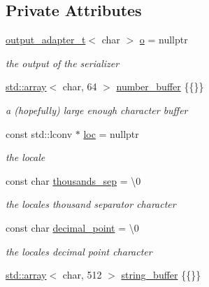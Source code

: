 \subsection*{Private Attributes}
\begin{DoxyCompactItemize}
\item 
\hyperlink{namespacenlohmann_1_1detail_a0fd8edff7729aa2dd92b070964bade2e}{output\+\_\+adapter\+\_\+t}$<$ char $>$ \hyperlink{classnlohmann_1_1detail_1_1serializer_acf3c88660d3cbc65fc71c4d84f2a9f59}{o} = nullptr
\begin{DoxyCompactList}\small\item\em the output of the serializer \end{DoxyCompactList}\item 
\hyperlink{namespacenlohmann_1_1detail_a1ed8fc6239da25abcaf681d30ace4985af1f713c9e000f5d3f280adbd124df4f5}{std\+::array}$<$ char, 64 $>$ \hyperlink{classnlohmann_1_1detail_1_1serializer_a1a9d8b344a6cb47728a3519693ec03d1}{number\+\_\+buffer} \{\{\}\}
\begin{DoxyCompactList}\small\item\em a (hopefully) large enough character buffer \end{DoxyCompactList}\item 
const std\+::lconv $\ast$ \hyperlink{classnlohmann_1_1detail_1_1serializer_a1952945b7652afb59d3903cc8457a589}{loc} = nullptr
\begin{DoxyCompactList}\small\item\em the locale \end{DoxyCompactList}\item 
const char \hyperlink{classnlohmann_1_1detail_1_1serializer_a78a6ae833bb6cf7f00cb0d51db114b14}{thousands\+\_\+sep} = \textquotesingle{}\textbackslash{}0\textquotesingle{}
\begin{DoxyCompactList}\small\item\em the locale\textquotesingle{}s thousand separator character \end{DoxyCompactList}\item 
const char \hyperlink{classnlohmann_1_1detail_1_1serializer_a311e5d6f4b31d5be0eb3c0cb20b6965a}{decimal\+\_\+point} = \textquotesingle{}\textbackslash{}0\textquotesingle{}
\begin{DoxyCompactList}\small\item\em the locale\textquotesingle{}s decimal point character \end{DoxyCompactList}\item 
\hyperlink{namespacenlohmann_1_1detail_a1ed8fc6239da25abcaf681d30ace4985af1f713c9e000f5d3f280adbd124df4f5}{std\+::array}$<$ char, 512 $>$ \hyperlink{classnlohmann_1_1detail_1_1serializer_a9c9b7ca63a66e59e5e7ffe8a2acf5c8f}{string\+\_\+buffer} \{\{\}\}

\end{DoxyCompactItemize}
